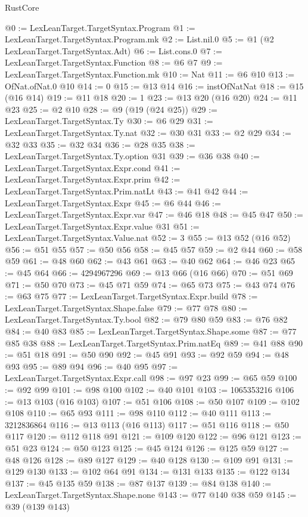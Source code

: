 \begin{lexlean}{RustCore}
\begin{coremodule}
@0 := LexLeanTarget.TargetSyntax.Program
@1 := LexLeanTarget.TargetSyntax.Program.mk
@2 := List.nil.{0}
@5 := @1 (@2 LexLeanTarget.TargetSyntax.Adt)
@6 := List.cons.{0}
@7 := LexLeanTarget.TargetSyntax.Function
@8 := @6 @7
@9 := LexLeanTarget.TargetSyntax.Function.mk
@10 := Nat
@11 := @6 @10
@13 := OfNat.ofNat.{0} @10
@14 := 0
@15 := @13 @14
@16 := instOfNatNat
@18 := @15 (@16 @14)
@19 := @11 @18
@20 := 1
@23 := @13 @20 (@16 @20)
@24 := @11 @23
@25 := @2 @10
@28 := @9 (@19 (@24 @25))
@29 := LexLeanTarget.TargetSyntax.Ty
@30 := @6 @29
@31 := LexLeanTarget.TargetSyntax.Ty.nat
@32 := @30 @31
@33 := @2 @29
@34 := @32 @33
@35 := @32 @34
@36 := @28 @35
@38 := LexLeanTarget.TargetSyntax.Ty.option @31
@39 := @36 @38
@40 := LexLeanTarget.TargetSyntax.Expr.cond
@41 := LexLeanTarget.TargetSyntax.Expr.prim
@42 := LexLeanTarget.TargetSyntax.Prim.natLt
@43 := @41 @42
@44 := LexLeanTarget.TargetSyntax.Expr
@45 := @6 @44
@46 := LexLeanTarget.TargetSyntax.Expr.var
@47 := @46 @18
@48 := @45 @47
@50 := LexLeanTarget.TargetSyntax.Expr.value @31
@51 := LexLeanTarget.TargetSyntax.Value.nat
@52 := 3
@55 := @13 @52 (@16 @52)
@56 := @51 @55
@57 := @50 @56
@58 := @45 @57
@59 := @2 @44
@60 := @58 @59
@61 := @48 @60
@62 := @43 @61
@63 := @40 @62
@64 := @46 @23
@65 := @45 @64
@66 := 4294967296
@69 := @13 @66 (@16 @66)
@70 := @51 @69
@71 := @50 @70
@73 := @45 @71 @59
@74 := @65 @73
@75 := @43 @74
@76 := @63 @75
@77 := LexLeanTarget.TargetSyntax.Expr.build
@78 := LexLeanTarget.TargetSyntax.Shape.false
@79 := @77 @78
@80 := LexLeanTarget.TargetSyntax.Ty.bool
@82 := @79 @80 @59
@83 := @76 @82
@84 := @40 @83
@85 := LexLeanTarget.TargetSyntax.Shape.some
@87 := @77 @85 @38
@88 := LexLeanTarget.TargetSyntax.Prim.natEq
@89 := @41 @88
@90 := @51 @18
@91 := @50 @90
@92 := @45 @91
@93 := @92 @59
@94 := @48 @93
@95 := @89 @94
@96 := @40 @95
@97 := LexLeanTarget.TargetSyntax.Expr.call
@98 := @97 @23
@99 := @65 @59
@100 := @92 @99
@101 := @98 @100
@102 := @40 @101
@103 := 1065353216
@106 := @13 @103 (@16 @103)
@107 := @51 @106
@108 := @50 @107
@109 := @102 @108
@110 := @65 @93
@111 := @98 @110
@112 := @40 @111
@113 := 3212836864
@116 := @13 @113 (@16 @113)
@117 := @51 @116
@118 := @50 @117
@120 := @112 @118 @91
@121 := @109 @120
@122 := @96 @121
@123 := @51 @23
@124 := @50 @123
@125 := @45 @124
@126 := @125 @59
@127 := @48 @126
@128 := @89 @127
@129 := @40 @128
@130 := @109 @91
@131 := @129 @130
@133 := @102 @64 @91
@134 := @131 @133
@135 := @122 @134
@137 := @45 @135 @59
@138 := @87 @137
@139 := @84 @138
@140 := LexLeanTarget.TargetSyntax.Shape.none
@143 := @77 @140 @38 @59
@145 := @39 (@139 @143)

\end{coremodule}
\end{lexlean}
